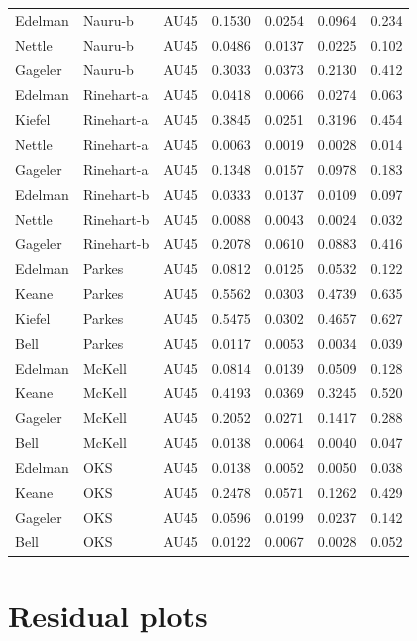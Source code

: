 \documentclass{monashthesis}
\begin{document}
\begin{center}
\begin{longtable}{lllllll}
Edelman & Nauru-b & AU45 & 0.1530 & 0.0254 & 0.0964 & 0.234 \\
Nettle & Nauru-b & AU45 & 0.0486 & 0.0137 & 0.0225 & 0.102 \\
Gageler & Nauru-b & AU45 & 0.3033 & 0.0373 & 0.2130 & 0.412 \\
Edelman & Rinehart-a & AU45 & 0.0418 & 0.0066 & 0.0274 & 0.063 \\
Kiefel & Rinehart-a & AU45 & 0.3845 & 0.0251 & 0.3196 & 0.454 \\
Nettle & Rinehart-a & AU45 & 0.0063 & 0.0019 & 0.0028 & 0.014 \\
Gageler & Rinehart-a & AU45 & 0.1348 & 0.0157 & 0.0978 & 0.183 \\
Edelman & Rinehart-b & AU45 & 0.0333 & 0.0137 & 0.0109 & 0.097 \\
Nettle & Rinehart-b & AU45 & 0.0088 & 0.0043 & 0.0024 & 0.032 \\
Gageler & Rinehart-b & AU45 & 0.2078 & 0.0610 & 0.0883 & 0.416 \\
Edelman & Parkes & AU45 & 0.0812 & 0.0125 & 0.0532 & 0.122 \\
Keane & Parkes & AU45 & 0.5562 & 0.0303 & 0.4739 & 0.635 \\
Kiefel & Parkes & AU45 & 0.5475 & 0.0302 & 0.4657 & 0.627 \\
Bell & Parkes & AU45 & 0.0117 & 0.0053 & 0.0034 & 0.039 \\
Edelman & McKell & AU45 & 0.0814 & 0.0139 & 0.0509 & 0.128 \\
Keane & McKell & AU45 & 0.4193 & 0.0369 & 0.3245 & 0.520 \\
Gageler & McKell & AU45 & 0.2052 & 0.0271 & 0.1417 & 0.288 \\
Bell & McKell & AU45 & 0.0138 & 0.0064 & 0.0040 & 0.047 \\
Edelman & OKS & AU45 & 0.0138 & 0.0052 & 0.0050 & 0.038 \\
Keane & OKS & AU45 & 0.2478 & 0.0571 & 0.1262 & 0.429 \\
Gageler & OKS & AU45 & 0.0596 & 0.0199 & 0.0237 & 0.142 \\
Bell & OKS & AU45 & 0.0122 & 0.0067 & 0.0028 & 0.052 \\
\end{longtable}
\end{center}

\hypertarget{residual-plots}{%
\section{Residual plots}\label{residual-plots}}
\end{document}
